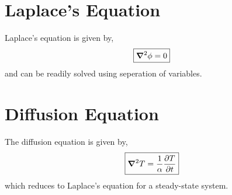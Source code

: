 \documentclass{book}
\begin{document}
\section{Laplace's Equation}
Laplace's equation is given by,
\begin{equation}
	\boxed{\grad^2\phi = 0}
\end{equation}
and can be readily solved using seperation of variables.
\section{Diffusion Equation}
The diffusion equation is given by,
\begin{equation}
	\boxed{\grad^2T = \frac{1}{\alpha}\pdv{T}{t}}
\end{equation}
which reduces to Laplace's equation for a steady-state system.
\end{document}
